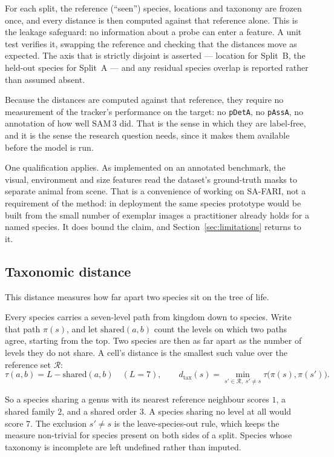 For each split, the reference (``seen'') species, locations and taxonomy are frozen once, and every distance is
then computed against that reference alone. This is the leakage safeguard: no information about a probe can
enter a feature. A unit test verifies it, swapping the reference and checking that the distances move as
expected. The axis that is strictly disjoint is asserted --- location for Split~B, the held-out species for
Split~A --- and any residual species overlap is reported rather than assumed absent.

Because the distances are computed against that reference, they require no measurement of the tracker's
performance on the target: no \texttt{pDetA}, no \texttt{pAssA}, no annotation of how well SAM\,3 did. That is
the sense in which they are label-free, and it is the sense the research question needs, since it makes them
available before the model is run.

One qualification applies. As implemented on an annotated benchmark, the visual,
environment and size features read the dataset's ground-truth masks to separate animal from scene. That is a
convenience of working on SA-FARI, not a requirement of the method: in deployment the same species prototype
would be built from the small number of exemplar images a practitioner already holds for a named species. It
does bound the claim, and Section~\ref{sec:limitations} returns to it.

\subsection{Taxonomic distance}
This distance measures how far apart two species sit on the tree of life.

Every species carries a seven-level path from kingdom down to species. Write that path $\pi(s)$, and let
$\mathrm{shared}(a,b)$ count the levels on which two paths agree, starting from the top. Two species are then
as far apart as the number of levels they do not share. A cell's distance is the smallest such value over the
reference set $\mathcal{R}$:
\begin{equation}
  \tau(a,b)=L-\mathrm{shared}(a,b)\quad (L=7),
  \qquad
  d_{\mathrm{tax}}(s)=\min_{s'\in\mathcal{R},\;s'\neq s}\tau\big(\pi(s),\pi(s')\big).
  \label{eq:taxdist}
\end{equation}

So a species sharing a genus with its nearest reference neighbour scores $1$, a shared family $2$, and a shared
order $3$. A species sharing no level at all would score $7$. The exclusion $s'\neq s$ is the leave-species-out
rule, which keeps the measure non-trivial for species present on both sides of a split. Species whose taxonomy
is incomplete are left undefined rather than imputed.

